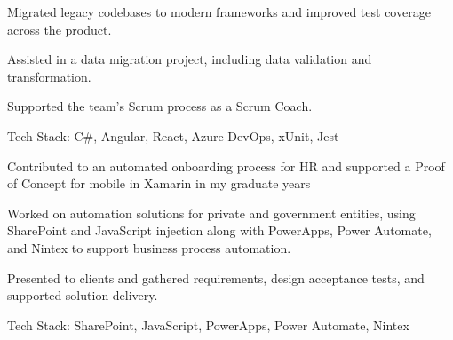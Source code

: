 \documentclass[]{deedy-resume-openfont}
\begin{document}
\begin{minipage}[t]{0.66\textwidth}
\vspace{\topsep}
\begin{tightemize}
\item Migrated legacy codebases to modern frameworks and improved test coverage across the product.
\item Assisted in a data migration project, including data validation and transformation.
\item Supported the team's Scrum process as a Scrum Coach.
\end{tightemize}
Tech Stack: C\#, Angular, React, Azure DevOps, xUnit, Jest
\sectionsep

\vspace{\topsep}
\begin{tightemize}
\item Contributed to an automated onboarding process for HR and supported a Proof of Concept for mobile in Xamarin in my graduate years
\item Worked on automation solutions for private and government entities, using SharePoint and JavaScript injection along with PowerApps, Power Automate, and Nintex to support business process automation.
\item Presented to clients and gathered requirements, design acceptance tests, and supported solution delivery.
\end{tightemize}
Tech Stack: SharePoint, JavaScript, PowerApps, Power Automate, Nintex
\sectionsep

\end{minipage} 
\end{document}
